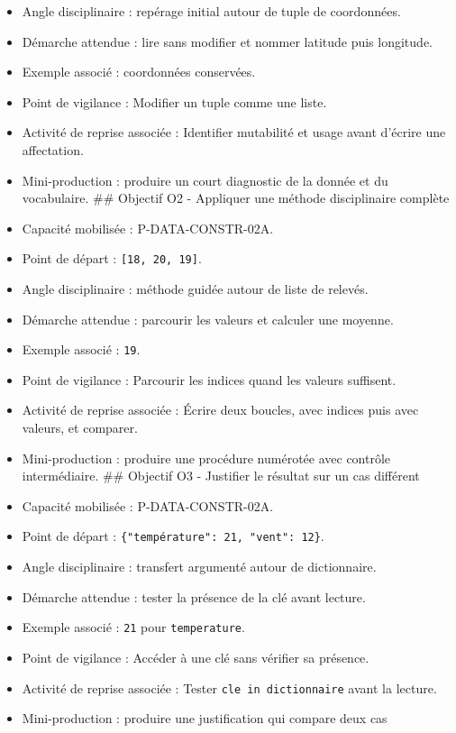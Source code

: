\begin{itemize}
\item
  Angle disciplinaire : repérage initial autour de tuple de coordonnées.
\item
  Démarche attendue : lire sans modifier et nommer latitude puis
  longitude.
\item
  Exemple associé : coordonnées conservées.
\item
  Point de vigilance : Modifier un tuple comme une liste.
\item
  Activité de reprise associée : Identifier mutabilité et usage avant
  d'écrire une affectation.
\item
  Mini-production : produire un court diagnostic de la donnée et du
  vocabulaire. \#\# Objectif O2 - Appliquer une méthode disciplinaire
  complète
\item
  Capacité mobilisée : P-DATA-CONSTR-02A.
\item
  Point de départ : \texttt{{[}18,\ 20,\ 19{]}}.
\item
  Angle disciplinaire : méthode guidée autour de liste de relevés.
\item
  Démarche attendue : parcourir les valeurs et calculer une moyenne.
\item
  Exemple associé : \texttt{19}.
\item
  Point de vigilance : Parcourir les indices quand les valeurs
  suffisent.
\item
  Activité de reprise associée : Écrire deux boucles, avec indices puis
  avec valeurs, et comparer.
\item
  Mini-production : produire une procédure numérotée avec contrôle
  intermédiaire. \#\# Objectif O3 - Justifier le résultat sur un cas
  différent
\item
  Capacité mobilisée : P-DATA-CONSTR-02A.
\item
  Point de départ : \texttt{\{"température":\ 21,\ "vent":\ 12\}}.
\item
  Angle disciplinaire : transfert argumenté autour de dictionnaire.
\item
  Démarche attendue : tester la présence de la clé avant lecture.
\item
  Exemple associé : \texttt{21} pour \texttt{temperature}.
\item
  Point de vigilance : Accéder à une clé sans vérifier sa présence.
\item
  Activité de reprise associée : Tester \texttt{cle\ in\ dictionnaire}
  avant la lecture.
\item
  Mini-production : produire une justification qui compare deux cas

\end{itemize}
